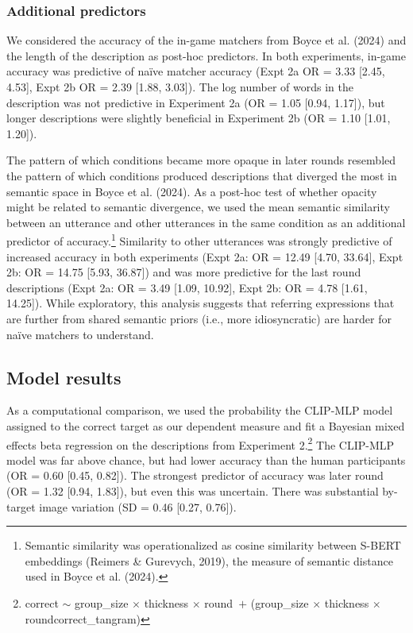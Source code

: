 \documentclass[10pt, letterpaper]{article}
\begin{document}
\subsubsection{Additional predictors}\label{additional-predictors}

We considered the accuracy of the in-game matchers from Boyce et al.
(2024) and the length of the description as post-hoc predictors. In both
experiments, in-game accuracy was predictive of naïve matcher accuracy
(Expt 2a OR = 3.33 {[}2.45, 4.53{]}, Expt 2b OR = 2.39 {[}1.88,
3.03{]}). The log number of words in the description was not predictive
in Experiment 2a (OR = 1.05 {[}0.94, 1.17{]}), but longer descriptions
were slightly beneficial in Experiment 2b (OR = 1.10 {[}1.01, 1.20{]}).

The pattern of which conditions became more opaque in later rounds
resembled the pattern of which conditions produced descriptions that
diverged the most in semantic space in Boyce et al. (2024). As a
post-hoc test of whether opacity might be related to semantic
divergence, we used the mean semantic similarity between an utterance
and other utterances in the same condition as an additional predictor of
accuracy.\footnote{Semantic similarity was operationalized as cosine
  similarity between S-BERT embeddings (Reimers \& Gurevych, 2019), the
  measure of semantic distance used in Boyce et al. (2024).} Similarity
to other utterances was strongly predictive of increased accuracy in
both experiments (Expt 2a: OR = 12.49 {[}4.70, 33.64{]}, Expt 2b: OR =
14.75 {[}5.93, 36.87{]}) and was more predictive for the last round
descriptions (Expt 2a: OR = 3.49 {[}1.09, 10.92{]}, Expt 2b: OR = 4.78
{[}1.61, 14.25{]}). While exploratory, this analysis suggests that
referring expressions that are further from shared semantic priors
(i.e., more idiosyncratic) are harder for naïve matchers to understand.

\subsection{Model results}\label{model-results}

As a computational comparison, we used the probability the CLIP-MLP
model assigned to the correct target as our dependent measure and fit a
Bayesian mixed effects beta regression on the descriptions from
Experiment 2.\footnote{correct \({\sim}\) group\_size \({\times}\)
  thickness \({\times}\) round~\({+}\) (group\_size \({\times}\)
  thickness \({\times}\) round\textbar correct\_tangram)} The CLIP-MLP
model was far above chance, but had lower accuracy than the human
participants (OR = 0.60 {[}0.45, 0.82{]}). The strongest predictor of
accuracy was later round (OR = 1.32 {[}0.94, 1.83{]}), but even this was
uncertain. There was substantial by-target image variation (SD = 0.46
{[}0.27, 0.76{]}).
\end{document}
